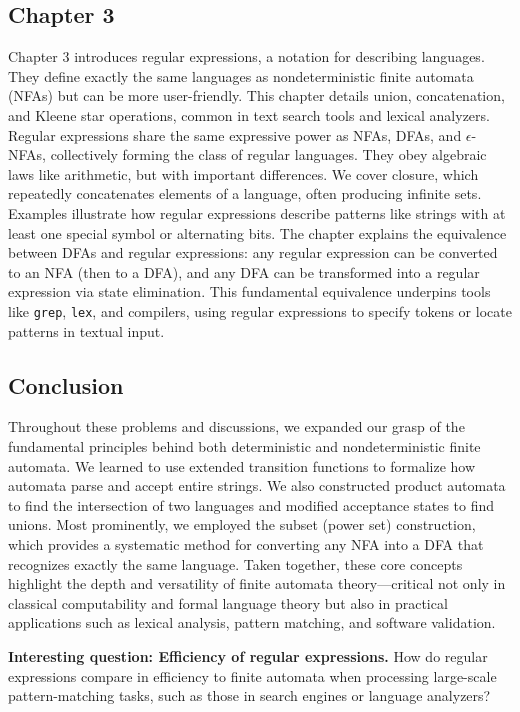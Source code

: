 \documentclass{article}
\begin{document}
\subsection{Chapter 3}

Chapter 3 introduces regular expressions, a notation for describing languages. They define exactly the same languages as nondeterministic finite automata (NFAs) but can be more user-friendly. This chapter details union, concatenation, and Kleene star operations, common in text search tools and lexical analyzers. Regular expressions share the same expressive power as NFAs, DFAs, and $\epsilon$-NFAs, collectively forming the class of regular languages. They obey algebraic laws like arithmetic, but with important differences. We cover closure, which repeatedly concatenates elements of a language, often producing infinite sets. Examples illustrate how regular expressions describe patterns like strings with at least one special symbol or alternating bits. The chapter explains the equivalence between DFAs and regular expressions: any regular expression can be converted to an NFA (then to a DFA), and any DFA can be transformed into a regular expression via state elimination. This fundamental equivalence underpins tools like \texttt{grep}, \texttt{lex}, and compilers, using regular expressions to specify tokens or locate patterns in textual input.

\subsection{Conclusion}

Throughout these problems and discussions, we expanded our grasp of the fundamental principles behind both deterministic and nondeterministic finite automata. We learned to use extended transition functions to formalize how automata parse and accept entire strings. We also constructed product automata to find the intersection of two languages and modified acceptance states to find unions. Most prominently, we employed the subset (power set) construction, which provides a systematic method for converting any NFA into a DFA that recognizes exactly the same language. Taken together, these core concepts highlight the depth and versatility of finite automata theory—critical not only in classical computability and formal language theory but also in practical applications such as lexical analysis, pattern matching, and software validation.

\textbf{ Interesting question: Efficiency of regular expressions.}
How do regular expressions compare in efficiency to finite automata when processing large-scale pattern-matching tasks, such as those in search engines or language analyzers?
\end{document}
